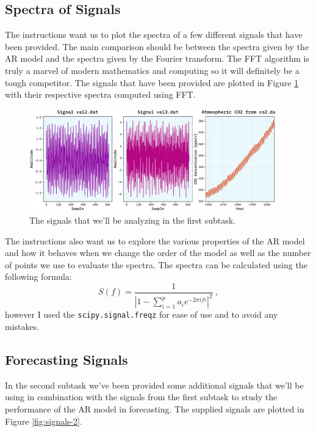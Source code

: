 \documentclass[10pt, titlepage, a4paper]{article}
\begin{document}
\subsection{Spectra of Signals}
The instructions want us to plot the spectra of a few different signals that have been provided. The main comparison 
should be between the spectra given by the AR model and the spectra given by the Fourier transform. The FFT algorithm 
is truly a marvel of modern mathematics and computing so it will definitely be a tough competitor. The signals that have 
been provided are plotted in Figure \ref{fig:signals} with their respective spectra computed using FFT.

\begin{figure}[H]
    \centering
    \includegraphics[width=0.95\textwidth]{../MaxEntropy/Images/supplied-data.pdf}
    \caption{The signals that we'll be analyzing in the first subtask.}
    \label{fig:signals}
\end{figure}

The instructions also want us to explore the various properties of the AR model and how it behaves when we change the
order of the model as well as the number of points we use to evaluate the spectra. The spectra can be calculated 
using the following formula:
%
\begin{equation}
    S(f) = \frac{1}{|1 - \sum_{i=1}^p a_i e^{-2\pi i f i}|^2}\>,
\end{equation}
%
however I used the \texttt{scipy.signal.freqz} for ease of use and to avoid any mistakes. 

\subsection{Forecasting Signals}
In the second subtask we've been provided some additional signals that we'll be using in combination with the signals from 
the first subtask to study the performance of the AR model in forecasting. The supplied signals are plotted in Figure 
\ref{fig:signals-2}.
\end{document}
